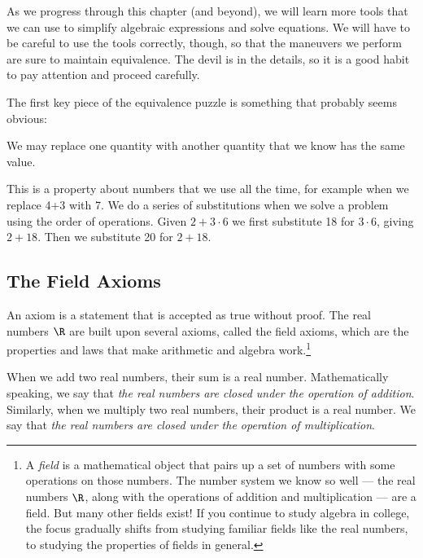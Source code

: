 As we progress through this chapter (and beyond), we will learn more tools that we can use to simplify algebraic expressions and solve equations. We will have to be careful to use the tools correctly, though, so that the maneuvers we perform are sure to maintain equivalence. The devil is in the details, so it is a good habit to pay attention and proceed carefully.

The first key piece of the equivalence puzzle is something that probably seems obvious:

\begin{boxeddef}[Substitution]
We may replace one quantity with another quantity that we know has the same value.
\end{boxeddef}

This is a property about numbers that we use all the time, for example when we replace 4+3 with 7. We do a series of substitutions when we solve a problem using the order of operations. Given $2+3\cdot6$ we first substitute 18 for $3\cdot6$, giving $2+18$. Then we substitute 20 for $2+18$.

\subsection{The Field Axioms}

An \gls{axiom} is a statement that is accepted as true without proof. The real numbers $\R$ are built upon several axioms, called the \glspl{field axiom}, which are the properties and laws that make arithmetic and algebra work.\footnote{A \textit{field} is a mathematical object that pairs up a set of numbers with some operations on those numbers. The number system we know so well --- the real numbers $\R$, along with the operations of addition and multiplication --- are a field. But many other fields exist! If you continue to study algebra in college, the focus gradually shifts from studying familiar fields like the real numbers, to studying the properties of fields in general.}

\begin{boxeddefex}
When we add two real numbers, their sum is a real number. Mathematically speaking, we say that \textit{the real numbers are closed under the operation of addition}.
\tcblower
Similarly, when we multiply two real numbers, their product is a real number. We say that \textit{the real numbers are closed under the operation of multiplication}.
\end{boxeddefex}

